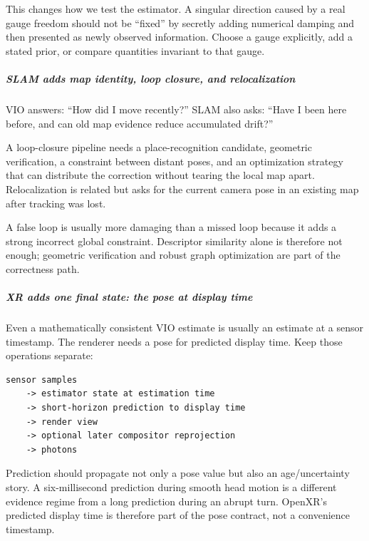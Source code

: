 This changes how we test the estimator. A singular direction caused by a real gauge freedom should not be ``fixed'' by secretly adding numerical damping and then presented as newly observed information. Choose a gauge explicitly, add a stated prior, or compare quantities invariant to that gauge.

\subparagraph{SLAM adds map identity, loop closure, and relocalization}\label{04-visual-computing-ii-ch035-slam-adds-map-identity-loop-closure-and-relocalization}

\hypertarget{04-visual-computing-ii-ch035-slam-adds-map-identity-loop-closure-and-relocalization}{}

VIO answers: ``How did I move recently?'' SLAM also asks: ``Have I been here before, and can old map evidence reduce accumulated drift?''

A loop-closure pipeline needs a place-recognition candidate, geometric verification, a constraint between distant poses, and an optimization strategy that can distribute the correction without tearing the local map apart. Relocalization is related but asks for the current camera pose in an existing map after tracking was lost.

A false loop is usually more damaging than a missed loop because it adds a strong incorrect global constraint. Descriptor similarity alone is therefore not enough; geometric verification and robust graph optimization are part of the correctness path.

\subparagraph{XR adds one final state: the pose at display time}\label{04-visual-computing-ii-ch035-xr-adds-one-final-state-the-pose-at-display-time}

\hypertarget{04-visual-computing-ii-ch035-xr-adds-one-final-state-the-pose-at-display-time}{}

Even a mathematically consistent VIO estimate is usually an estimate at a sensor timestamp. The renderer needs a pose for predicted display time. Keep those operations separate:

\begin{verbatim}
sensor samples
    -> estimator state at estimation time
    -> short-horizon prediction to display time
    -> render view
    -> optional later compositor reprojection
    -> photons
\end{verbatim}

Prediction should propagate not only a pose value but also an age/uncertainty story. A six-millisecond prediction during smooth head motion is a different evidence regime from a long prediction during an abrupt turn. OpenXR's predicted display time is therefore part of the pose contract, not a convenience timestamp.


